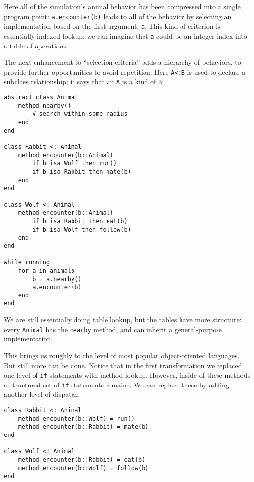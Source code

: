 Here all of the simulation's animal behavior has been
compressed into a single program point: \texttt{a.encounter(b)}
leads to all of the behavior by selecting an implementation based
on the first argument, \texttt{a}.
This kind of criterion is essentially indexed lookup; we can imagine
that \texttt{a} could be an integer index into a table of operations.

The next enhancement to ``selection criteria'' adds a hierarchy
of behaviors, to provide further opportunities to avoid repetition.
Here \texttt{A<:B} is used to declare a subclass relationship; it
says that an \texttt{A} is a kind of \texttt{B}:

\begin{singlespace}
\begin{verbatim}
abstract class Animal
    method nearby()
        # search within some radius
    end
end

class Rabbit <: Animal
    method encounter(b::Animal)
        if b isa Wolf then run()
        if b isa Rabbit then mate(b)
    end
end

class Wolf <: Animal
    method encounter(b::Animal)
        if b isa Rabbit then eat(b)
        if b isa Wolf then follow(b)
    end
end

while running
    for a in animals
        b = a.nearby()
        a.encounter(b)
    end
end
\end{verbatim}
\end{singlespace}

We are still essentially doing table lookup, but the tables have
more structure: every \texttt{Animal} has the \texttt{nearby}
method, and can inherit a general-purpose implementation.

This brings us roughly to the level of most popular object-oriented
languages.
But still more can be done.
Notice that in the first transformation we replaced one level of \texttt{if}
statements with method lookup.
However, inside of these methods a structured set of \texttt{if} statements
remains.
We can replace these by adding another level of dispatch.

\begin{singlespace}
\begin{verbatim}
class Rabbit <: Animal
    method encounter(b::Wolf) = run()
    method encounter(b::Rabbit) = mate(b)
end

class Wolf <: Animal
    method encounter(b::Rabbit) = eat(b)
    method encounter(b::Wolf) = follow(b)
end
\end{verbatim}
\end{singlespace}


